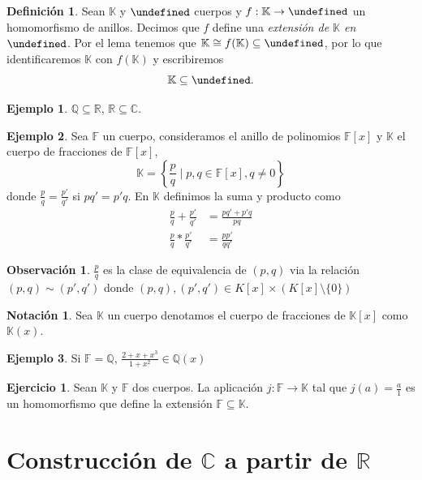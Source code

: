 \documentclass[10pt, spanish]{report}
\theoremstyle{definition}
\newtheorem*{defin}{Definición}
\newtheorem*{notacion}{Notación}
\newtheorem*{ej}{Ejemplo}
\newtheorem*{ejer}{Ejercicio}
\newtheorem*{obs}{Observación}
\newcommand{\Q}{\mathbb{Q}}
\newcommand{\R}{\mathbb{R}}
\newcommand{\C}{\mathbb{C}}
\newcommand{\F}{\mathbb{F}}
\newcommand{\K}{\mathbb{K}}
\let\L\undefined
\newcommand{\L}{\mathbb{L}}
\newcommand{\fecha}[1]{\marginpar{\underline{\footnotesize{#1}}}}
\begin{document}
\begin{defin}
    Sean $\K$ y $\L$ cuerpos y $f:\K\to\L$ un homomorfismo de anillos. Decimos
    que $f$ define una \textit{extensión de $\K$ en $\L$}.
    Por el lema tenemos que $\K\cong f(\K)\subseteq \L$, por lo que
    identificaremos $\K$ con $f(\K)$ y escribiremos \[\K\subseteq \L.\]
\end{defin}

\begin{ej}
    $\Q\subseteq\R$, $\R\subseteq\C$.
\end{ej}

\fecha{16/02}

\begin{ej}
    Sea $\F$ un cuerpo, consideramos el anillo de polinomios $\F[x]$ y
    $\K$ el cuerpo de fracciones de $\F[x]$,
    \[\K=\left\{ \frac{p}{q}\mid p,q\in \F[x], q\neq 0 \right\}\]
    donde $\frac{p}{q} = \frac{p'}{q'}$ si $pq'=p'q$.
    En $\K$ definimos la suma y producto como
    \begin{align*}
        \frac{p}{q}+\frac{p'}{q'}&=\frac{pq'+p'q}{pq}\\
        \frac{p}{q}*\frac{p'}{q'}&=\frac{pp'}{qq'}
    \end{align*}
\end{ej}

\begin{obs}
    $\frac{p}{q}$ es la clase de equivalencia de $(p,q)$ via la relación
    $(p,q)\sim(p',q')$ donde $(p,q),(p',q')\in K[x]\times(K[x]\setminus\{0\})$
\end{obs}

\begin{notacion}
    Sea $\K$ un cuerpo denotamos el cuerpo de fracciones de $\K[x]$ como
    $\K(x)$.
\end{notacion}

\begin{ej}
    Si $\F=\Q$, $\frac{2+x+x^3}{1+x^2}\in \Q(x)$
\end{ej}

\begin{ejer}
    Sean $\K$ y $\F$ dos cuerpos. La aplicación $j:\F\to\K$ tal que $j(a)=
    \frac{a}{1}$ es un homomorfismo que define la extensión $\F\subseteq \K$.
\end{ejer}


\section{Construcción de $\C$ a partir de $\R$}
\end{document}
